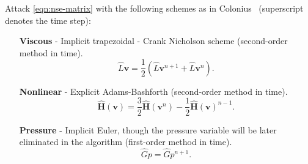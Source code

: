 \documentclass{article}
\numberwithin{equation}{section}
\begin{document}
Attack \cref{eqn:nse-matrix} with the following schemes as in Colonius~\cite{Colonius:2008} (superscript denotes the time step):
\begin{enumerate}
	\item[\textbf{Viscous}] - Implicit trapezoidal - Crank Nicholson scheme (second-order method in time).  
	\begin{equation}\label{eqn:viscous-crank-nicholson}
  		\hat{L}\boldsymbol{v}=\frac{1}{2}\left(\hat{L}\boldsymbol{v}^{n+1}+\hat{L}\boldsymbol{v}^n\right).
	\end{equation}

	\item[\textbf{Nonlinear}] - Explicit Adams-Bashforth (second-order method in time).
	\begin{equation}\label{eqn:nonlinear-adams-bashforth}
		\mathbf{\hat{H}}(\boldsymbol{v}) = \frac{3}{2}\mathbf{\hat{H}}(\boldsymbol{v}^{n}) - \frac{1}{2}\mathbf{\hat{H}}(\boldsymbol{v})^{n-1}.
	\end{equation}

	\item[\textbf{Pressure}] - Implicit Euler, though the pressure variable will be later eliminated in the algorithm (first-order method in time). 
	\begin{equation}\label{eqn:pressure-implicit-euler} 
		\hat{G}p = \hat{G}p^{n+1}.
	\end{equation}
\end{enumerate}
\end{document}
